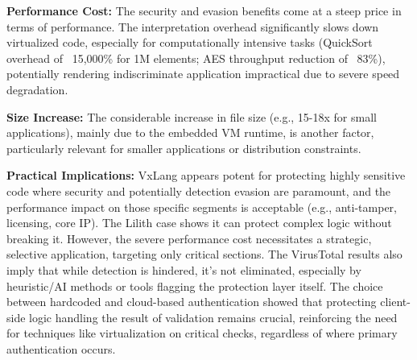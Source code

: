 \textbf{Performance Cost:} The security and evasion benefits come at a steep price in terms of performance. The interpretation overhead significantly slows down virtualized code, especially for computationally intensive tasks (QuickSort overhead of ~15,000\% for 1M elements; AES throughput reduction of ~83\%), potentially rendering indiscriminate application impractical due to severe speed degradation.

\textbf{Size Increase:} The considerable increase in file size (e.g., 15-18x for small applications), mainly due to the embedded VM runtime, is another factor, particularly relevant for smaller applications or distribution constraints.

\textbf{Practical Implications:} VxLang appears potent for protecting highly sensitive code where security and potentially detection evasion are paramount, and the performance impact on those specific segments is acceptable (e.g., anti-tamper, licensing, core IP). The Lilith case shows it can protect complex logic without breaking it. However, the severe performance cost necessitates a strategic, selective application, targeting only critical sections. The VirusTotal results also imply that while detection is hindered, it's not eliminated, especially by heuristic/AI methods or tools flagging the protection layer itself. The choice between hardcoded and cloud-based authentication showed that protecting client-side logic handling the result of validation remains crucial, reinforcing the need for techniques like virtualization on critical checks, regardless of where primary authentication occurs.
